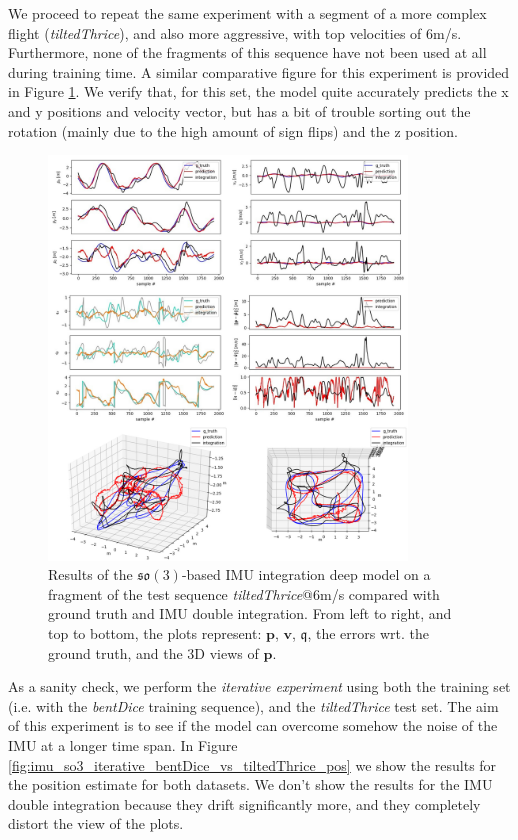 We proceed to repeat the same experiment with a segment of a more complex flight (\emph{tiltedThrice}), and also more aggressive, with top velocities of 6m/s. 
Furthermore, none of the fragments of this sequence have not been used at all during training time.
A similar comparative figure for this experiment is provided in Figure \ref{fig:imu_so3_tiltedThrice_val}. 
We verify that, for this set, the model quite accurately predicts the x and y positions and velocity vector, but has a bit of trouble sorting out the rotation (mainly due to the high amount of sign flips) and the z position. 

\begin{figure}[h]
   \centering
   \includegraphics[width=0.85\textwidth]{thesis_template/img/tilted_thrice_so3_full.jpg}
   \caption{Results of the $\mathfrak{so}(3)$-based IMU integration deep model on a fragment of the test sequence \emph{tiltedThrice}@6m/s compared with ground truth and IMU double integration. From left to right, and top to bottom, the plots represent: $\mathbf{p}$, $\mathbf{v}$, $\boldsymbol{\mathfrak{q}}$, the errors wrt. the ground truth, and the 3D views of $\mathbf{p}$.}
   \label{fig:imu_so3_tiltedThrice_val}
\end{figure}

As a sanity check, we perform the \emph{iterative experiment} using both the training set (i.e. with the \emph{bentDice} training sequence), and the \emph{tiltedThrice} test set. 
The aim of this experiment is to see if the model can overcome somehow the noise of the IMU at a longer time span.
In Figure \ref{fig:imu_so3_iterative_bentDice_vs_tiltedThrice_pos} we show the results for the position estimate for both datasets.
We don't show the results for the IMU double integration because they drift significantly more, and they completely distort the view of the plots. 

